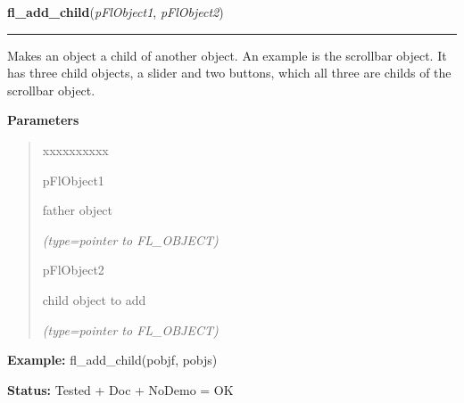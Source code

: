     \vspace{0.5ex}

\hspace{.8\funcindent}\begin{boxedminipage}{\funcwidth}

    \raggedright \textbf{fl\_add\_child}(\textit{pFlObject1}, \textit{pFlObject2})

    \vspace{-1.5ex}

    \rule{\textwidth}{0.5\fboxrule}
\setlength{\parskip}{2ex}
    Makes an object a child of another object. An example is the scrollbar 
    object. It has three child objects, a slider and two buttons, which all
    three are childs of the scrollbar object.

\setlength{\parskip}{1ex}
      \textbf{Parameters}
      \vspace{-1ex}

      \begin{quote}
        \begin{Ventry}{xxxxxxxxxx}

          \item[pFlObject1]

          father object

            {\it (type=pointer to FL\_OBJECT)}

          \item[pFlObject2]

          child object to add

            {\it (type=pointer to FL\_OBJECT)}

        \end{Ventry}

      \end{quote}

\textbf{Example:} fl\_add\_child(pobjf, pobjs)



\textbf{Status:} Tested + Doc + NoDemo = OK



    \end{boxedminipage}

    \label{xformslib:flbasic:fl_set_coordunit}

    \vspace{0.5ex}

